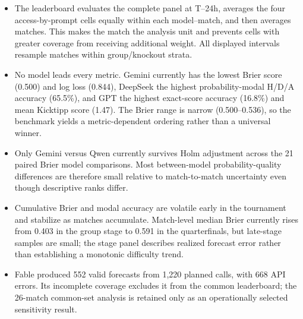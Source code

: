 \documentclass[sigconf,review]{acmart}
\newenvironment{draftbullets}
  {\begin{itemize}[leftmargin=1.25em,itemsep=1.5pt,topsep=2pt,parsep=0pt,partopsep=0pt]}
  {\end{itemize}}
\begin{document}
\begin{draftbullets}
  \item The leaderboard evaluates the complete panel at T--24h, averages the four access-by-prompt
  cells equally within each model--match, and then averages matches. This makes the match the analysis
  unit and prevents cells with greater coverage from receiving additional weight. All displayed
  intervals resample matches within group/knockout strata.

  \item No model leads every metric. Gemini currently has the lowest Brier score (0.500) and log loss
  (0.844), DeepSeek the highest probability-modal H/D/A accuracy (65.5\%), and GPT the highest
  exact-score accuracy (16.8\%) and mean Kicktipp score (1.47). The Brier range is narrow
  (0.500--0.536), so the benchmark yields a metric-dependent ordering rather than a universal winner.

  \item Only Gemini versus Qwen currently survives Holm adjustment across the 21 paired Brier model
  comparisons. Most between-model probability-quality differences are therefore small relative to
  match-to-match uncertainty even though descriptive ranks differ.

  \item Cumulative Brier and modal accuracy are volatile early in the tournament and stabilize as
  matches accumulate. Match-level median Brier currently rises from 0.403 in the group stage to 0.591
  in the quarterfinals, but late-stage samples are small; the stage panel describes realized forecast
  error rather than establishing a monotonic difficulty trend.

  \item Fable produced 552 valid forecasts from 1,220 planned calls, with 668 API errors. Its
  incomplete coverage excludes it from the common leaderboard; the 26-match common-set analysis is
  retained only as an operationally selected sensitivity result.
\end{draftbullets}

\begin{table}[t]
  \centering
  \caption{Complete-panel T--24h performance over 101 completed matches. Values are model means with
  95\% match-bootstrap intervals; lower Brier and log loss are better, while higher values are better
  for the remaining metrics. Ranks are descriptive and will be refreshed after the final freeze.}
  \label{tab:leaderboard}
  \resizebox{\textwidth}{!}{}
\end{table}
\end{document}

